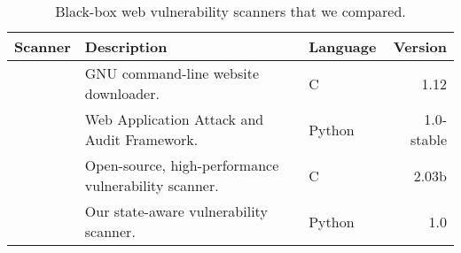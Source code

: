 \begin{table}[tb]
  \centering
  \small
  \begin{tabular}{lp{30ex}lr}
    \hline
    Scanner    &  Description &     Language & Version\\
    \hline
    \wget{}     &  GNU command-line website downloader.  &         C  & 1.12\\
    \waf{}     &  Web Application Attack and Audit Framework.                  &         Python &1.0-stable\\
    \skipfish{}      &  Open-source, high-performance vulnerability scanner.     &       C  &2.03b\\
    \crawler{}      &  Our state-aware vulnerability scanner.     &       Python   &1.0\\
    \hline
  \end{tabular}
  \caption{ Black-box web vulnerability scanners that we compared.   }
\end{table}
